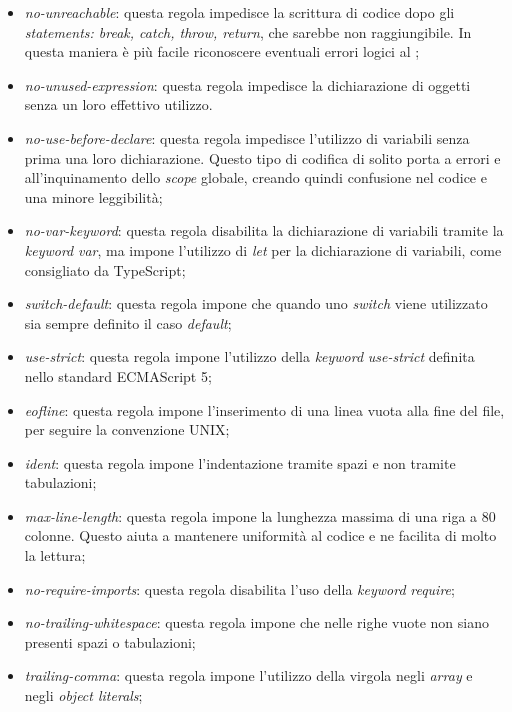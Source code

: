 \begin{itemize}
                \item \textit{no-unreachable}: questa regola impedisce la scrittura di codice dopo gli \textit{statements: break, catch, throw, return}, che sarebbe non raggiungibile. In questa maniera \`e pi\`u facile riconoscere eventuali errori logici al ;
                \item \textit{no-unused-expression}: questa regola impedisce la dichiarazione di oggetti senza un loro effettivo utilizzo. 
                \item \textit{no-use-before-declare}: questa regola impedisce l'utilizzo di variabili senza prima una loro dichiarazione. Questo tipo di codifica di solito porta a errori e all'inquinamento dello \textit{scope} globale, creando quindi confusione nel codice e una minore leggibilit\`a;
                \item \textit{no-var-keyword}: questa regola disabilita la dichiarazione di variabili tramite la \textit{keyword} \textit{var}, ma impone l'utilizzo di \textit{let} per la dichiarazione di variabili, come consigliato da TypeScript;
                \item \textit{switch-default}: questa regola impone che quando uno \textit{switch} viene utilizzato sia sempre definito il caso \textit{default};
                \item \textit{use-strict}: questa regola impone l'utilizzo della \textit{keyword} \textit{use-strict} definita nello standard ECMAScript 5;
                \item \textit{eofline}: questa regola impone l'inserimento di una linea vuota alla fine del file, per seguire la convenzione UNIX;
                \item \textit{ident}: questa regola impone l'indentazione tramite spazi e non tramite tabulazioni;
                \item \textit{max-line-length}: questa regola impone la lunghezza massima di una riga a 80 colonne. Questo aiuta a mantenere uniformit\`a al codice e ne facilita di molto la lettura;
                \item \textit{no-require-imports}: questa regola disabilita l'uso della \textit{keyword} \textit{require};
                \item \textit{no-trailing-whitespace}: questa regola impone che nelle righe vuote non siano presenti spazi o tabulazioni;
                \item \textit{trailing-comma}: questa regola impone l'utilizzo della virgola negli \textit{array} e negli \textit{object literals};

\end{itemize}
